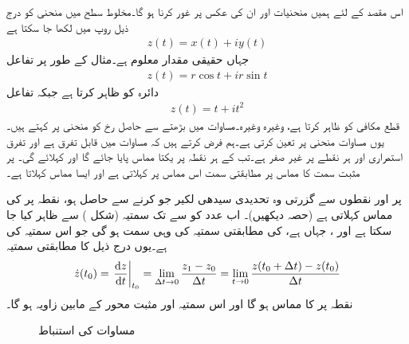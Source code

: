 اس مقصد کے لئے ہمیں منحنیات اور ان کی عکس پر غور کرنا ہو گا۔مخلوط سطح  میں منحنی  کو درج ذیل روپ میں لکھا جا سکتا ہے
\begin{align}\label{مساوات_نقش_عمومی_منحنی_الف}
z(t)=x(t)+iy(t)
\end{align}
جہاں  حقیقی مقدار معلوم ہے۔مثال کے طور پر تفاعل
\begin{align*}
z(t)=r\cos t+ir\sin t
\end{align*}
دائرہ  کو ظاہر کرتا ہے جبکہ تفاعل
\begin{align*}
z(t)=t+it^2
\end{align*}
قطع مکافی  کو ظاہر کرتا ہے، وغیرہ وغیرہ۔مساوات  میں بڑھتے  سے حاصل رخ کو منحنی پر  کہتے ہیں۔یوں مساوات  منحنی  پر   تعین کرتی ہے۔ہم فرض کرتے ہیں کہ مساوات  میں  قابل تفرق ہے اور تفرق  استمراری اور ہر نقطے پر غیر صفر ہے۔تب  کے ہر نقطہ پر یکتا مماس پایا جائے گا اور   کہلائے گی۔  پر مثبت سمت  کا مماس پر مطابقتی سمت  اس مماس پر  کہلاتی ہے اور ایسا مماس  کہلاتا ہے۔ 

 پر  اور   نقطوں سے گزرتی وہ تحدیدی سیدھی لکیر جو  کرنے سے حاصل ہو، نقطہ  پر  کی مماس کہلاتی ہے (حصہ  دیکھیں)۔ اب عدد  کو  سے  تک سمتیہ (شکل ) سے ظاہر کیا جا سکتا ہے اور  ، جہاں  ہے، کی مطابقتی سمتیہ کی وہی سمت ہو گی جو اس سمتیہ کی ہے۔یوں  درج ذیل کا مطابقتی سمتیہ
\begin{align}\label{مساوات_نقش_عمومی_منحنی_ب}
\dot{z}(t_0)=\left. \frac{\dif z}{\dif t}\right|_{t_0}=\lim_{\Delta t\to 0}\frac{z_1-z_0}{\Delta t}=\lim_{t\to 0} \frac{z(t_0+\Delta t)-z(t_0)}{\Delta t}
\end{align}
نقطہ  پر  کا مماس ہو گا اور اس سمتیہ اور مثبت  محور کے مابین زاویہ  ہو گا۔
\begin{figure}
\centering
{}
\caption{مساوات  کی استنباط}
\label{شکل_نقش_استنباط}
\end{figure}


